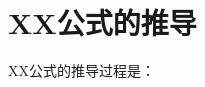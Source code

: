 \clearpage
\appendix
\renewcommand{\thesection}{附录\Alph{section}}
\renewcommand{\thefigure}{\Alph{section}.\arabic{figure}}
\renewcommand{\thetable}{\Alph{section}.\arabic{table}}
\renewcommand{\theequation}{\Alph{section}.\arabic{equation}}
\setcounter{section}{0}
\setcounter{figure}{0}
\setcounter{table}{0}
\setcounter{equation}{0}
\section{XX公式的推导}
XX公式的推导过程是：
